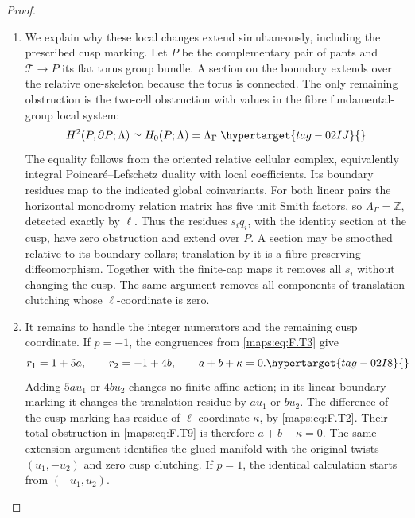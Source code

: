 \documentclass[11pt,a4paper]{article}
\numberwithin{equation}{section}
\theoremstyle{definition}
\begin{document}
\begin{proof}
\begin{enumerate}[label=\arabic*.]
\item We explain why these local changes extend simultaneously,
including the prescribed cusp marking.
Let $P$ be the complementary pair of pants and
$\mathcal T\to P$ its flat torus group bundle.
A section on the boundary extends over the relative
one-skeleton because the torus is connected.
The only remaining obstruction is the two-cell obstruction
with values in the fibre fundamental-group local system:
\begin{equation}
 H^2(P,\partial P;\Lambda)
        \simeq H_0(P;\Lambda)=\Lambda_\Gamma.
 \hypertarget{tag-02IJ}{}\label{maps:eq:F.T9}
\end{equation}
The equality follows from the oriented relative cellular
complex, equivalently integral Poincar\'e--Lefschetz duality
with local coefficients.  Its boundary residues map to
the indicated global coinvariants.
For both linear pairs the horizontal monodromy relation
matrix has five unit Smith factors, so
$\Lambda_\Gamma=\mathbb Z$, detected exactly by $\ell$.
Thus the residues $s_iq_i$, with the identity section at the
cusp, have zero obstruction and extend over $P$.
A section may be smoothed relative to its boundary collars;
translation by it is a fibre-preserving diffeomorphism.
Together with the finite-cap maps it removes all $s_i$
without changing the cusp.
The same argument removes all components of translation
clutching whose $\ell$-coordinate is zero.

\item It remains to handle the integer numerators and the remaining
cusp coordinate.  If $p=-1$, the congruences from \eqref{maps:eq:F.T3}
give
\begin{equation}
 r_1=1+5a,\qquad r_2=-1+4b,
 \qquad a+b+\kappa=0.
 \hypertarget{tag-02I8}{}\label{maps:eq:F.T10}
\end{equation}
Adding $5a u_1$ or $4b u_2$ changes no finite affine action;
in its linear boundary marking it changes the translation
residue by $a u_1$ or $b u_2$.
The difference of the cusp marking has residue of
$\ell$-coordinate $\kappa$, by \eqref{maps:eq:F.T2}.
Their total obstruction in \eqref{maps:eq:F.T9} is therefore
$a+b+\kappa=0$.
The same extension argument identifies the glued manifold
with the original twists $(u_1,-u_2)$ and zero cusp
clutching.
If $p=1$, the identical calculation starts from
$(-u_1,u_2)$.


\end{enumerate}
\end{proof}
\end{document}
